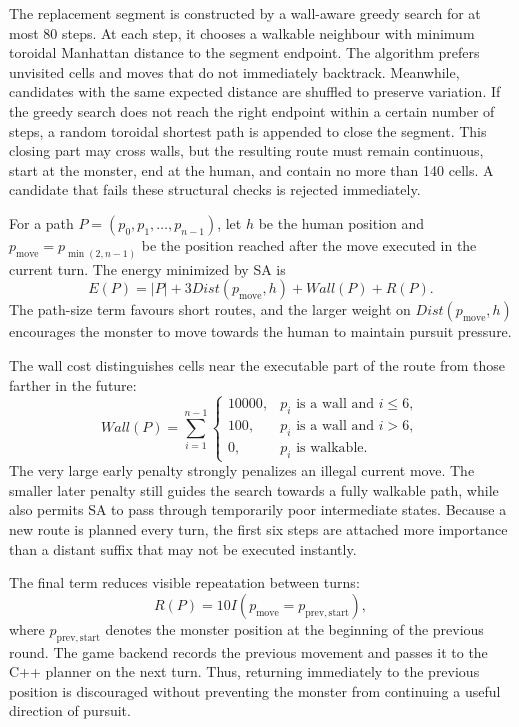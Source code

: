 \documentclass[12pt,a4paper]{article}
\begin{document}
The replacement segment is constructed by a wall-aware greedy search for at
most 80 steps. At each step, it chooses a walkable neighbour with minimum
toroidal Manhattan distance to the segment endpoint. The algorithm prefers unvisited cells and moves
that do not immediately backtrack. Meanwhile, candidates with the same expected distance
are shuffled to preserve variation. If the greedy search does not reach the right
endpoint within a certain number of steps, a random toroidal shortest path is appended to
close the segment. This closing part may cross walls, but the resulting route
must remain continuous, start at the monster, end at the human, and contain no
more than 140 cells. A candidate that fails these structural checks is rejected
immediately.

For a path $P=(p_0,p_1,\ldots,p_{n-1})$, let $h$ be the human position and
$p_{\mathrm{move}}=p_{\min(2,n-1)}$ be the position reached after the move
executed in the current turn. The energy minimized by SA is
\[
E(P)=|P|+3Dist(p_{\mathrm{move}},h)+Wall(P)+R(P).
\]
The path-size term favours short routes, and the larger weight on
$Dist(p_{\mathrm{move}},h)$ encourages the monster to move towards the human
to maintain pursuit pressure.

The wall cost distinguishes cells near the executable part of the route from
those farther in the future:
\[
Wall(P)=\sum_{i=1}^{n-1}
\begin{cases}
10000, & p_i\text{ is a wall and }i\leq 6,\\
100,   & p_i\text{ is a wall and }i>6,\\
0,     & p_i\text{ is walkable.}
\end{cases}
\]
The very large early penalty strongly penalizes an illegal current move. The
smaller later penalty still guides the search towards a fully walkable path,
while also permits SA to pass through temporarily poor intermediate states. Because a
new route is planned every turn, the first six steps are attached more importance than a
distant suffix that may not be executed instantly.

The final term reduces visible repeatation between turns:
\[
R(P)=10I(p_{\mathrm{move}}=p_{\mathrm{prev,start}}),
\]
where $p_{\mathrm{prev,start}}$ denotes the monster position at the beginning of
the previous round. The game backend records the previous movement and passes
it to the C++ planner on the next turn. Thus, returning immediately to the
previous position is discouraged without preventing the monster from
continuing a useful direction of pursuit.
\end{document}
